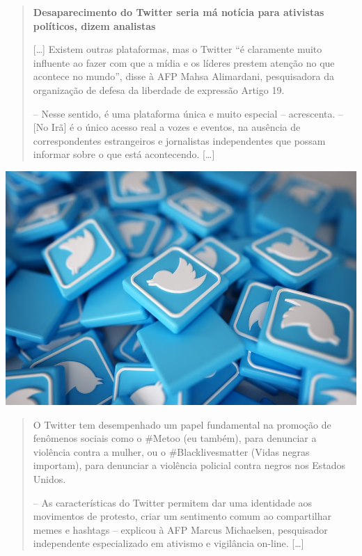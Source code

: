 \begin{minipage}{.5\textwidth}
\begin{quote}
\textbf{Desaparecimento do Twitter seria má notícia para ativistas
políticos, dizem analistas }

{[}\ldots{}{]}
Existem outras plataformas, mas o Twitter “é claramente muito influente
ao fazer com que a mídia e os líderes prestem atenção no que acontece no
mundo”, disse à AFP Mahsa Alimardani, pesquisadora da organização de
defesa da liberdade de expressão Artigo 19.

– Nesse sentido, é uma plataforma única e muito especial –
acrescenta. – {[}No Irã{]} é o único acesso real a vozes e eventos, na
ausência de correspondentes estrangeiros e jornalistas independentes que
possam informar sobre o que está acontecendo. {[}\ldots{}{]}
\end{quote}
\end{minipage}\hspace{.5cm}
\begin{minipage}{.5\textwidth}
\includegraphics[width=\textwidth]{./imgs/img50.png}
\end{minipage}

\begin{quote}
O Twitter tem desempenhado um papel fundamental na promoção de fenômenos
sociais como o \#Metoo (eu também), para denunciar a violência contra a
mulher, ou o \#Blacklivesmatter (Vidas negras importam), para denunciar
a violência policial contra negros nos Estados Unidos.

– As características do Twitter permitem dar uma identidade aos
movimentos de protesto, criar um sentimento comum ao compartilhar memes
e hashtags – explicou à AFP Marcus Michaelsen, pesquisador independente especializado em ativismo e vigilância on-line. {[}\ldots{}{]}

\end{quote}


